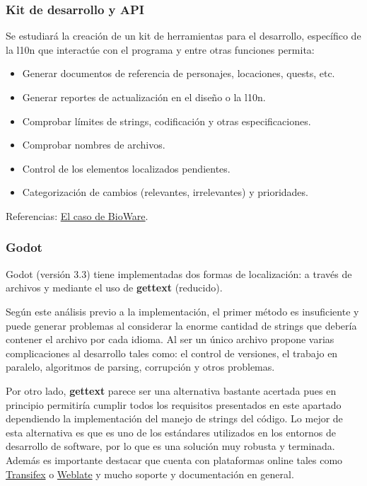 \subsubsection{Kit de desarrollo y API}\label{i18n:toolkit-y-api}
Se estudiará la creación de un kit de herramientas para el desarrollo, específico de la l10n que interactúe con el programa y entre otras funciones permita:
\begin{itemize}
	\item Generar documentos de referencia de personajes, locaciones, quests, etc.
	\item Generar reportes de actualización en el diseño o la l10n.
	\item Comprobar límites de strings, codificación y otras especificaciones.
	\item Comprobar nombres de archivos.
	\item Control de los elementos localizados pendientes.
	\item Categorización de cambios (relevantes, irrelevantes) y prioridades.
\end{itemize}
Referencias: \href{https://drive.google.com/file/d/1OJxibGWbvxJq3_8WwmR93yzCCCvq7iu-/view?usp=sharing}{El caso de BioWare}.

\subsubsection{Godot}\label{i18n:i18n-godot}
Godot (versión 3.3) tiene implementadas dos formas de localización: a través de archivos  y mediante el uso de \textbf{gettext} (reducido).

Según este análisis previo a la implementación, el primer método es insuficiente y puede generar problemas al considerar la enorme cantidad de strings que debería contener el archivo  por cada idioma. Al ser un único archivo propone varias complicaciones al desarrollo tales como: el control de versiones, el trabajo en paralelo, algoritmos de parsing, corrupción y otros problemas.

Por otro lado, \textbf{gettext} parece ser una alternativa bastante acertada pues en principio permitiría cumplir todos los requisitos presentados en este apartado dependiendo la implementación del manejo de strings del código. Lo mejor de esta alternativa es que es uno de los estándares utilizados en los entornos de desarrollo de software, por lo que es una solución muy robusta y terminada. Además es importante destacar que cuenta con plataformas online tales como \href{https://www.transifex.com/}{Transifex} o \href{https://weblate.org}{Weblate} y mucho soporte y documentación en general.

